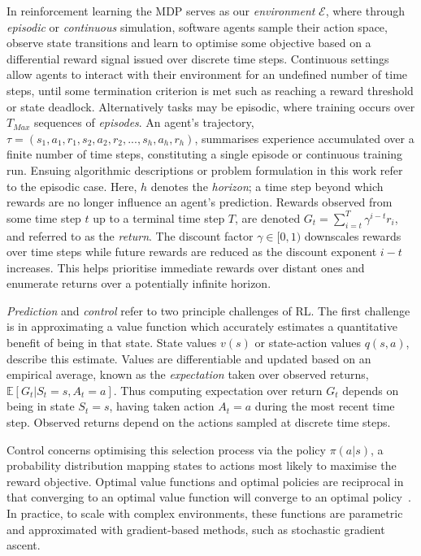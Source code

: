 \documentclass[runningheads]{llncs}
\begin{document}

In reinforcement learning the MDP serves as our \emph{environment} $\mathcal{E}$, where through \emph{episodic} or \emph{continuous} simulation, software agents sample their action space, observe state transitions and learn to optimise some objective based on a differential reward signal issued over discrete time steps. Continuous settings allow agents to interact with their environment for an undefined number of time steps, until some termination criterion is met such as reaching a reward threshold or state deadlock. Alternatively tasks may be episodic, where training occurs over $T_{Max}$ sequences of \emph{episodes}. An agent's trajectory, $\tau = (s_1, a_1, r_1,  s_2, a_2, r_2,...,s_h, a_h, r_h)$, summarises experience accumulated over a finite number of time steps, constituting a single episode or continuous training run. Ensuing algorithmic descriptions or problem formulation in this work refer to the episodic case. Here, $h$ denotes the \emph{horizon}; a time step beyond which rewards are no longer influence an agent's prediction. Rewards observed from some time step $t$ up to a terminal time step $T$, are denoted $G_{t} = \sum_{i=t}^{T}\gamma^{i-t}r_{i}$, and referred to as the \emph{return}. The discount factor $\gamma \in [0,1)$ downscales rewards over time steps while future rewards are reduced as the discount exponent $i-t$ increases. This helps prioritise immediate rewards over distant ones and enumerate returns over a potentially infinite horizon. 

\emph{Prediction} and \emph{control} refer to two principle challenges of RL. The first challenge is in approximating a value function which accurately estimates a quantitative benefit of being in that state. State values $v(s)$ or state-action values $q(s,a)$, describe this estimate. Values are differentiable and updated based on an empirical average, known as the \emph{expectation} taken over observed returns, $\mathbb{E}[G_t | S_t = s, A_t = a]$. Thus computing expectation over return $G_t$ depends on being in state $S_t = s$, having taken action $A_t = a$ during the most recent time step. Observed returns depend on the actions sampled at discrete time steps. 

Control concerns optimising this selection process via the policy $\pi(a|s)$, a probability distribution mapping states to actions most likely to maximise the reward objective. Optimal value functions and optimal policies are reciprocal in that converging to an optimal value function will converge to an optimal policy~\cite{melo2008analysis}. In practice, to scale with complex environments, these functions are parametric and approximated with gradient-based methods, such as stochastic gradient ascent.
\end{document}
